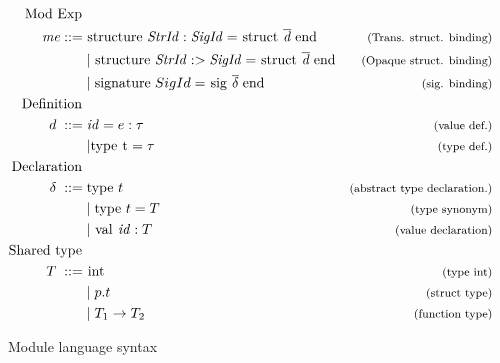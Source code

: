 \begin{figure}[!htb]
\begin{align*}
\begin{aligned}
%
\text{Mod Exp }\\
\mathit{me} ::= \; & \text{\lsttext{structure}} \;  \mathit{StrId : SigId} = \text{\lsttext{struct}}\; \overline{\mathit{d}}\; \text{\lsttext{end}}
                                    & \expl{(Trans. struct. binding)}\\
&|\; \text{\lsttext{structure}} \;  \mathit{StrId :> SigId} = 
\text{\lsttext{struct}}\; \overline{\mathit{d}}\; \text{\lsttext{end}}
                                    & \expl{(Opaque struct. binding)}\\
&|\; \text{\lsttext{signature}} \; SigId = 
\text{\lsttext{sig}}\; \overline{\mathit{\delta}}\; \text{\lsttext{end}} 
                                    & \expl{(sig. binding)}\\
%
\text{Definition }\\
d \; ::= \; &\mathit{id}=e:\tau     & \expl{(value def.)} \\
& | \text{\lsttext{type\ t}}= \tau          & \expl{(type def.)} \\
\text{Declaration }\\
\delta \; ::= \; & \text{\lsttext{type}}\ t  & \expl{(abstract type declaration.)} \\
& | \; \text{\lsttext{type}} \ t = T      & \expl{(type synonym)} \\
& | \; \text{\lsttext{val}}\ \mathit{id}:T         & \expl{(value declaration)} \\
%
\text{Shared type } \\
T \; ::= \; &\text{\lsttext{int}}                  & \expl{(type int)} \\
&| \; p.t                           & \expl{(struct type)}\\
&| \; T_{1} \rightarrow T_{2} & \expl{(function type)}\\
\end{aligned}
\end{align*}
\caption{Module language syntax \label{fig:ModuleSyntax}}
\label{fig:Syntax}
\end{figure}
